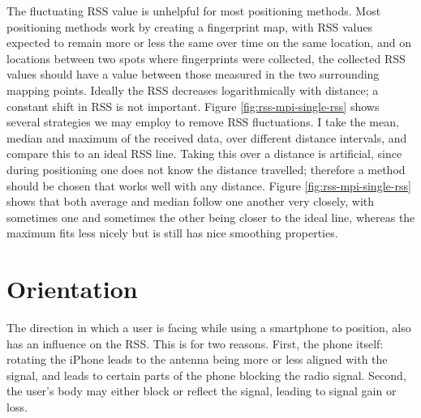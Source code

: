 
The fluctuating RSS value is unhelpful for most positioning methods.
Most positioning methods work by creating a fingerprint map, with RSS values expected to remain more or less the same over time on the same location, and on locations between two spots where fingerprints were collected, the collected RSS values should have a value between those measured in the two surrounding mapping points.
Ideally the RSS decreases logarithmically with distance; a constant shift in RSS is not important.
Figure \ref{fig:rss-mpi-single-rss} shows several strategies we may employ to remove RSS fluctuations.
I take the mean, median and maximum of the received data, over different distance intervals, and compare this to an ideal RSS line.
Taking this over a distance is artificial, since during positioning one does not know the distance travelled; therefore a method should be chosen that works well with any distance.
Figure \ref{fig:rss-mpi-single-rss} shows that both average and median follow one another very closely, with sometimes one and sometimes the other being closer to the ideal line, whereas the maximum fits less nicely but is still has nice smoothing properties.

\section{Orientation}
\label{sec:rss-rot}

The direction in which a user is facing while using a smartphone to position, also has an influence on the RSS.
This is for two reasons.
First, the phone itself: rotating the iPhone leads to the antenna being more or less aligned with the signal, and leads to certain parts of the phone blocking the radio signal.
Second, the user's body may either block or reflect the signal, leading to signal gain or loss.

